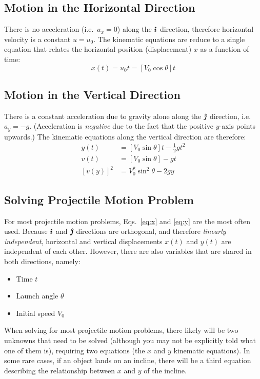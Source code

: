 \subsection{Motion in the Horizontal Direction}
There is no acceleration (i.e.\ $a_x=0$) along the $\bm{\hat\imath}$ direction, therefore
horizontal velocity is a constant $u=u_0$. The kinematic equations are reduce
to a single equation that relates the horizontal position (displacement) $x$ as
a function of time:
\begin{equation}
  x(t)=u_0t=\left[V_0\cos\theta\right] t
  \label{eq:x}
\end{equation}

\subsection{Motion in the Vertical Direction}
There is a constant acceleration due to gravity alone along the $\bm{\hat\jmath}$
direction, i.e.\ $a_y=-g$. (Acceleration is \emph{negative} due to the fact that
the positive $y$-axis points upwards.) The kinematic equations along the
vertical direction are therefore:
\begin{align}
  y(t) &= \left[V_0\sin\theta\right]t-\frac12gt^2\label{eq:y}\\
  v(t) &= \left[V_0\sin\theta\right] -gt\\
  \left[v(y)\right]^2&=V_0^2\sin^2\theta-2gy
  \label{eq:maxh}
\end{align}

\subsection{Solving Projectile Motion Problem}
For most projectile motion problems, Eqs.~\ref{eq:x} and \ref{eq:y} are the
most often used. Because $\bm{\hat\imath}$ and $\bm{\hat\jmath}$ directions are orthogonal, and
therefore \emph{linearly independent}, horizontal and vertical displacements
$x(t)$ and $y(t)$ are independent of each other. However, there are also
variables that are shared in both directions, namely:
\begin{itemize}[nosep,leftmargin=12pt]
\item Time $t$
\item Launch angle $\theta$
\item Initial speed $V_0$
\end{itemize}
When solving for most projectile motion problems, there likely will be two
unknowns that need to be solved (although you may not be explicitly told what
one of them is), requiring two equations (the $x$ and $y$ kinematic equations).
In some rare cases, if an object lands on an incline, there will be a third
equation describing the relationship between $x$ and $y$ of the incline.

